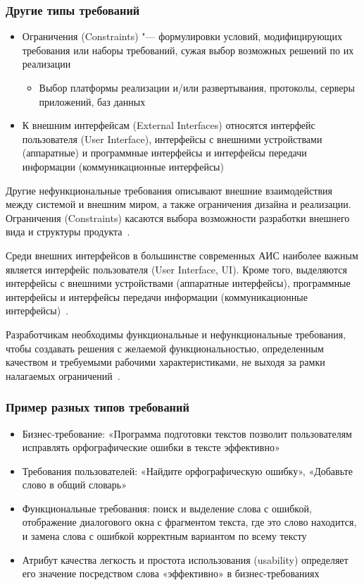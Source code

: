 \documentclass{../industrial-development}
\begin{document}
\begin{frame} \frametitle{Другие типы требований}
	\begin{itemize}
\item \alert{Ограничения (Constraints)} "--- формулировки условий, модифицирующих требования или наборы требований, сужая выбор возможных решений по их реализации
\begin{itemize}
	\item Выбор платформы реализации и/или развертывания, протоколы, серверы приложений, баз данных
\end{itemize}
\item К \alert{внешним интерфейсам (External Interfaces)} относятся интерфейс пользователя (User Interface), интерфейсы с внешними устройствами (аппаратные) и программные интерфейсы и интерфейсы передачи информации (коммуникационные интерфейсы)
	\end{itemize}
	\end{frame}

\lecturenotes

Другие нефункциональные требования описывают внешние взаимодействия между системой и внешним миром, а также ограничения дизайна и реализации. \alert{Ограничения (Constraints)} касаются выбора возможности разработки внешнего вида и структуры продукта~\cite[с.~10]{Wiegers}.

Среди \alert{внешних интерфейсов} в большинстве современных АИС наиболее важным является интерфейс пользователя (User Interface, UI). Кроме того, выделяются интерфейсы с внешними устройствами (аппаратные интерфейсы), программные интерфейсы и интерфейсы передачи информации (коммуникационные интерфейсы)~\cite[с.~10]{Maglinec}.

Разработчикам необходимы функциональные и нефункциональные требования, чтобы создавать решения с желаемой функциональностью, определенным качеством и требуемыми рабочими характеристиками, не выходя за рамки налагаемых ограничений~\cite[с.~11]{Wiegers}.


\begin{frame} \frametitle{Пример разных типов требований}
	\begin{itemize}
	\item \alert{Бизнес-требование}: «Программа подготовки текстов позволит пользователям исправлять орфографические ошибки в тексте эффективно»
	\item \alert{Требования пользователей}: «Найдите орфографическую ошибку», «Добавьте слово в общий словарь»
	\item \alert{Функциональные требования}: поиск и выделение слова с ошибкой, отображение диалогового окна с фрагментом текста, где это слово находится, и замена слова с ошибкой корректным вариантом по всему тексту
	\item \alert{Атрибут качества} легкость и простота использования (usability) определяет его значение посредством слова «эффективно» в бизнес-требованиях
	\end{itemize}
\end{frame}
\end{document}
